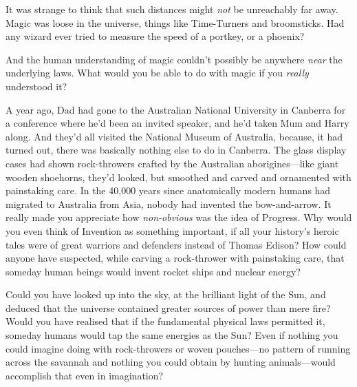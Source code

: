 It was strange to think that such distances might \emph{not} be
unreachably far away. Magic was loose in the universe, things like
Time-Turners and broomsticks. Had any wizard ever tried to measure the
speed of a portkey, or a phoenix?

And the human understanding of magic couldn't possibly be anywhere
\emph{near} the underlying laws. What would you be able to do with magic
if you \emph{really} understood it?

A year ago, Dad had gone to the Australian National University in
Canberra for a conference where he'd been an invited speaker, and he'd
taken Mum and Harry along. And they'd all visited the National Museum of
Australia, because, it had turned out, there was basically nothing else
to do in Canberra. The glass display cases had shown rock-throwers
crafted by the Australian aborigines---like giant wooden shoehorns,
they'd looked, but smoothed and carved and ornamented with painstaking
care. In the 40,000 years since anatomically modern humans had migrated
to Australia from Asia, nobody had invented the bow-and-arrow. It really
made you appreciate how \emph{non-obvious} was the idea of Progress. Why
would you even think of Invention as something important, if all your
history's heroic tales were of great warriors and defenders instead of
Thomas Edison? How could anyone have suspected, while carving a
rock-thrower with painstaking care, that someday human beings would
invent rocket ships and nuclear energy?

Could you have looked up into the sky, at the brilliant light of the
Sun, and deduced that the universe contained greater sources of power
than mere fire? Would you have realised that if the fundamental physical
laws permitted it, someday humans would tap the same energies as the
Sun? Even if nothing you could imagine doing with rock-throwers or woven
pouches---no pattern of running across the savannah and nothing you
could obtain by hunting animals---would accomplish that even in
imagination?

